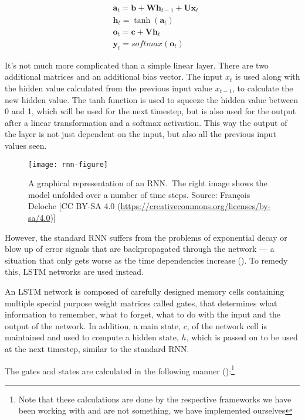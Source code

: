 \begin{align*}
    & \textbf{a}_t = \textbf{b} + \textbf{W} \textbf{h}_{t-1} + \textbf{U} \textbf{x}_t \\
    & \textbf{h}_t = \tanh(\textbf{a}_t) \\
    & \textbf{o}_t = \textbf{c} + \textbf{V} \textbf{h}_t \\
    & \textbf{y}_t = softmax(\textbf{o}_t)
\end{align*}

It's not much more complicated than a simple linear layer. There are two
additional matrices and an additional bias vector. The input $x_t$ is used
along with the hidden value calculated from the previous input value $x_{t-1}$,
to calculate the new hidden value. The tanh function is used to squeeze the
hidden value between 0 and 1, which will be used for the next timestep, but is
also used for the output after a linear transformation and a softmax activation.
This way the output of the layer is not just dependent on the input, but also
all the previous input values seen.

\begin{figure}[h]
    \texttt{[image: rnn-figure]}
    \caption{A graphical representation of an RNN.\ The right image shows the
    model unfolded over a number of time steps. Source: François Deloche [CC BY-SA
    4.0 (\url{https://creativecommons.org/licenses/by-sa/4.0})]
    }\label{fig:rnn}
\end{figure}

However, the standard RNN suffers from the problems of exponential decay or blow
up of error signals that are backpropagated through the network --- a situation
that only gets worse as the time dependencies increase
(\cite{hochreiter2001gradient}). To remedy this, LSTM networks are used instead.

An LSTM network is composed of carefully designed memory cells containing
multiple special purpose weight matrices called gates, that determines what
information to remember, what to forget, what to do with the input and the
output of the network. In addition, a main state, $c$, of the network cell is
maintained and used to compute a hidden state, $h$, which is passed on to be
used at the next timestep, similar to the standard RNN.\

The gates and states are calculated in the following manner
(\cite{huang2015bidirectional}):\footnote{Note that
    these calculations are done by the respective frameworks we have been
working with and are not something, we have implemented ourselves}


